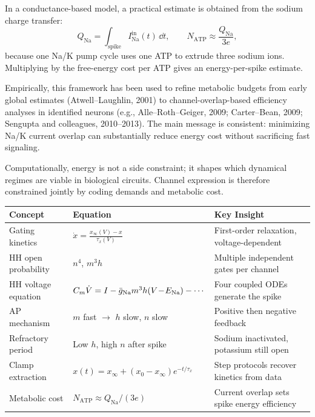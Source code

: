 In a conductance-based model, a practical estimate is obtained from the sodium charge transfer:
%
\begin{equation}
  Q_{\text{Na}} = \int_{\text{spike}} I_{\text{Na}}^{\text{in}}(t)\,\dd t,
  \qquad
  N_{\text{ATP}} \approx \frac{Q_{\text{Na}}}{3e},
  \label{eq:spike-atp}
\end{equation}
%
because one Na/K pump cycle uses one ATP to extrude three sodium ions. Multiplying by the free-energy cost per ATP gives an energy-per-spike estimate.

Empirically, this framework has been used to refine metabolic budgets from early global estimates (Atwell--Laughlin, 2001) to channel-overlap-based efficiency analyses in identified neurons (e.g., Alle--Roth--Geiger, 2009; Carter--Bean, 2009; Sengupta and colleagues, 2010--2013). The main message is consistent: minimizing Na/K current overlap can substantially reduce energy cost without sacrificing fast signaling.

Computationally, energy is not a side constraint; it shapes which dynamical regimes are viable in biological circuits. Channel expression is therefore constrained jointly by coding demands and metabolic cost.


\begin{chaptersummary}

\begin{center}
\renewcommand{\arraystretch}{1.6}
\begin{tabularx}{\textwidth}{@{}l X X@{}}
  \toprule
  \textbf{Concept} & \textbf{Equation} & \textbf{Key Insight} \\
  \midrule
  Gating kinetics &
  $\displaystyle \dot{x} = \frac{x_\infty(V) - x}{\tau_x(V)}$ &
  First-order relaxation, voltage-dependent \\
  HH open probability &
  $n^4$, \; $m^3 h$ &
  Multiple independent gates per channel \\
  HH voltage equation &
  $C_m\dot{V} = I - \bar{g}_{\mathrm{Na}}m^3h(V\!-\!E_{\mathrm{Na}}) - \cdots$ &
  Four coupled ODEs generate the spike \\
  AP mechanism &
  $m$ fast $\to$ $h$ slow, $n$ slow &
  Positive then negative feedback \\
  Refractory period &
  Low $h$, high $n$ after spike &
  Sodium inactivated, potassium still open \\
  Clamp extraction &
  $x(t)=x_\infty+(x_0-x_\infty)e^{-t/\tau_x}$ &
  Step protocols recover kinetics from data \\
  Metabolic cost &
  $N_{\text{ATP}} \approx Q_{\text{Na}}/(3e)$ &
  Current overlap sets spike energy efficiency \\
  \bottomrule
\end{tabularx}
\end{center}

\end{chaptersummary}

